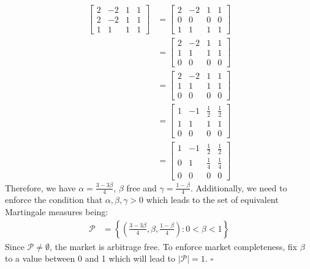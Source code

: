 \documentclass{article}
\begin{document}
\begin{align*}
\left[\begin{array}{ccc|c}
2 & -2 & 1 & 1\\
2 & -2 & 1 & 1\\
1 & 1 & 1 & 1
\end{array} \right] & = 
\left[\begin{array}{ccc|c}
2 & -2 & 1 & 1\\
0 & 0 & 0 & 0\\
1 & 1 & 1 & 1
\end{array} \right] \\
& = \left[\begin{array}{ccc|c}
2 & -2 & 1 & 1\\
1 & 1 & 1 & 1\\
0 & 0 & 0 & 0
\end{array} \right] \\
& = \left[\begin{array}{ccc|c}
2 & -2 & 1 & 1\\
1 & 1 & 1 & 1\\
0 & 0 & 0 & 0
\end{array} \right] \\
& = \left[\begin{array}{ccc|c}
1 & -1 & \frac{1}{2} & \frac{1}{2}\\
1 & 1 & 1 & 1\\
0 & 0 & 0 & 0
\end{array} \right] \\
& = \left[\begin{array}{ccc|c}
1 & -1 & \frac{1}{2} & \frac{1}{2}\\
0 & 1 & \frac{1}{4} & \frac{1}{4}\\
0 & 0 & 0 & 0
\end{array} \right]
\end{align*}
Therefore, we have $\alpha = \frac{3-3\beta}{4}$, $\beta$ free and $\gamma = \frac{1-\beta}{4}$. Additionally, we need to enforce the condition that $\alpha,\beta,\gamma>0$ which leads to the set of equivalent Martingale measures being:
\begin{align*}
    \mathcal{P} & =\left\{ \left(\frac{3-3\beta}{4},\beta,\frac{1-\beta}{4}\right): 0<\beta<1\right\}
\end{align*}
Since $\mathcal{P}\neq\emptyset$, the market is arbitrage free. To enforce market completeness, fix $\beta$ to a value between 0 and 1 which will lead to $|\mathcal{P}| = 1$. $\square$
\end{document}
